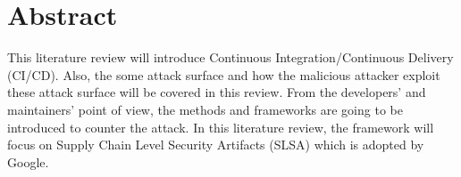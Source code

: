 \section{Abstract}

This literature review will introduce Continuous Integration/Continuous Delivery (CI/CD).
Also, the some attack surface and how the malicious attacker exploit these attack surface
will be covered in this review. From the developers' and maintainers' point of view, the 
methods and frameworks are going to be introduced to counter the attack.
In this literature review, the framework will focus on Supply Chain Level Security Artifacts 
(SLSA) which is adopted by Google. 
